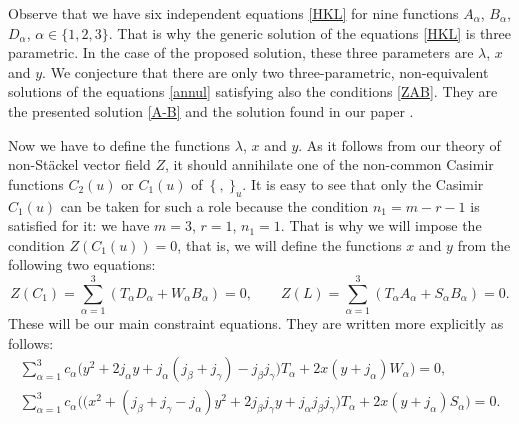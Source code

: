 \documentclass[10pt,a4paper]{amsart}
\def\a{\alpha}
\def\b{\beta}
\def\g{\gamma}
\def\l{\lambda}
\numberwithin{equation}{section}
\begin{document}
\begin{Remark}
Observe that we have six independent equations \eqref{HKL} %
 for nine functions $A_{\a}$, $B_{\a}$, $D_{\a}$, $\a \in \{1,2,3\}$. That is why the generic solution of the equations \eqref{HKL} %
 is three parametric. In the case of the proposed solution, these three parameters are $\l$, $x$ and $y$. We conjecture that there are only two three-parametric, non-equivalent solutions of the equations \eqref{annul} satisfying also the conditions \eqref{ZAB}. They are the presented solution \eqref{A-B} and the solution found in our paper \cite{SkrAsSoVExCle}.
\end{Remark}

Now we have to define the functions $\l$, $x$ and $y$. As it follows from our theory of non-St\"ackel vector field $Z$, it should annihilate one of the non-common Casimir functions $C_2(u)$ or $C_1(u)$ of~$\{\ ,\ \}_u$. It is easy to see that only the Casimir $C_1(u)$ can be taken for such a role because the condition $n_1=m-r-1$ is satisfied for it: we have $m=3$, $r=1$, $n_1=1$. That is why we will impose the condition
$Z(C_1(u))=0$,
 that is, we will define the functions $x$ and $y$ from the following two equations:
\[%
Z(C_1)=\sum\limits_{\a=1}^3 (T_{\a} D_{\a}+ W_{\a} B_{\a})= 0, \qquad Z(L)= \sum\limits_{\a=1}^3 (T_{\a} A_{\a}+ S_{\a} B_{\a})= 0.
\]
These will be our main constraint equations. They are written more explicitly as follows:
\begin{subequations}\label{xy}
\begin{gather}
\sum\limits_{\a=1}^3 c_{\a}\bigl(y^2+2j_{\a} y+j_{\a}(j_{\b}+j_{\g})-j_{\b}j_{\g}) T_{\a}+ 2 x (y+j_{\a}) W_{\a} \bigr)= 0,
\\
\sum\limits_{\a=1}^3 c_{\a}\bigl( \big(x^2+ (j_{\b}+j_{\g}-j_{\a}) y^2+2 j_{\b} j_{\g} y + j_{\a} j_{\b} j_{\g}\big) T_{\a}+ 2 x (y+j_{\a}) S_{\a} \bigr)= 0.
\end{gather}
\end{subequations}
\end{document}
